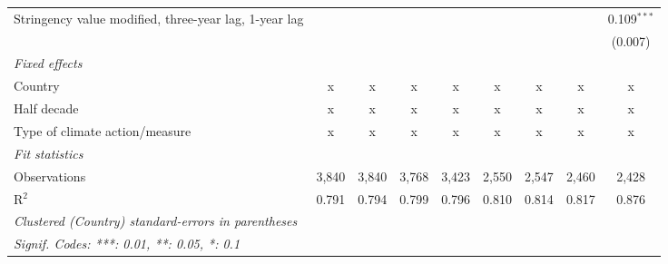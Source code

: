 \begin{table}[htbp]
\begin{tabular}{lcccccccc}
      Stringency value modified, three-year lag, 1-year lag                    &               &               &                &               &               &                &               & 0.109$^{***}$\\   
                                                                               &               &               &                &               &               &                &               & (0.007)\\   
      \emph{Fixed effects}\\
      Country                                                                  & x             & x             & x              & x             & x             & x              & x             & x\\  
      Half decade                                                              & x             & x             & x              & x             & x             & x              & x             & x\\  
      Type of climate action/measure                                           & x             & x             & x              & x             & x             & x              & x             & x\\  
      \midrule \emph{Fit statistics}\\
      Observations                                                             & 3,840         & 3,840         & 3,768          & 3,423         & 2,550         & 2,547          & 2,460         & 2,428\\  
      R$^2$                                                                    & 0.791         & 0.794         & 0.799          & 0.796         & 0.810         & 0.814          & 0.817         & 0.876\\  
      \midrule
      \multicolumn{9}{l}{\emph{Clustered (Country) standard-errors in parentheses}}\\
      \multicolumn{9}{l}{\emph{Signif. Codes: ***: 0.01, **: 0.05, *: 0.1}}\\
   \end{tabular}
\end{table}


